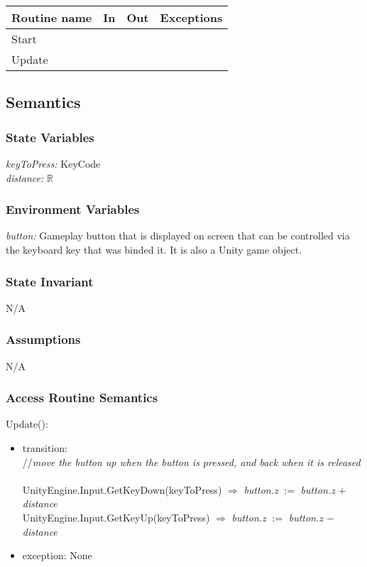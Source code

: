 \documentclass[12pt]{article}
\begin{document}
\begin{tabular}{| l | l | l | l |}
\hline
\textbf{Routine name} & \textbf{In} & \textbf{Out} & \textbf{Exceptions}\\
\hline
Start       &           &           &           \\
\hline
Update       &           &           &          \\
\hline
\end{tabular}

\subsection {Semantics}

\subsubsection {State Variables}

\textit{keyToPress:} KeyCode \\
\textit{distance:} $\mathbb{R}$

\subsubsection {Environment Variables}

\textit{button:} Gameplay button that is displayed on screen that can be controlled via the keyboard key that was binded it. It is also a Unity game object.

\subsubsection {State Invariant}
N/A
\subsubsection {Assumptions}
N/A
\subsubsection {Access Routine Semantics}

\noindent Update():
\begin{itemize}
	\item transition: \\
	//\textit{move the button up when the button is pressed, and back when it is released}\\\\
	UnityEngine.Input.GetKeyDown(keyToPress) $\Rightarrow$ \textit{button.z} $:=$ \textit{button.z} $+$ \textit{distance}\\
	UnityEngine.Input.GetKeyUp(keyToPress) $\Rightarrow$ \textit{button.z} $:=$ \textit{button.z} $-$ \textit{distance}
	\item exception: None
\end{itemize}
\end{document}
